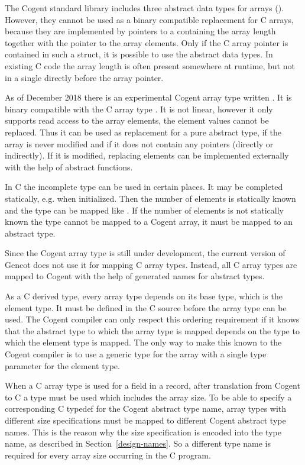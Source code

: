 The Cogent standard library includes three abstract data types for arrays (). 
However, they cannot be used as a binary compatible replacement for C arrays, because they are implemented by 
pointers to a  containing the array length together with the pointer to the array elements. 
Only if the C array pointer is contained in such a struct, it is possible to use the abstract data types. 
In existing C code the array length is often present somewhere at runtime, but not in a single 
directly before the array pointer.

As of December 2018 there is an experimental Cogent array type written . It is binary compatible 
with the C array type . It is not linear, however it only supports read access to the array elements, 
the element values cannot be replaced. Thus it can be used as replacement for a pure abstract type, if the array 
is never modified and if it does not contain any pointers (directly or indirectly). If it is modified, replacing
elements can be implemented externally with the help of abstract functions.

In C the incomplete type  can be used in certain places. It may be completed statically, e.g. 
when initialized. Then the number of elements is statically known and the type can be mapped like .
If the number of elements is not statically known the type cannot be mapped to a Cogent array, it must be mapped 
to an abstract type.

Since the Cogent array type is still under development, the current version of Gencot does not use it for
mapping C array types. Instead, all C array types are mapped to Cogent with the help of generated names for 
abstract types.

As a C derived type, every array type depends on its base type, which is the element type. It must be defined in
the C source before the array type can be used. The Cogent compiler can only respect this ordering requirement if
it knows that the abstract type to which the array type is mapped depends on the type to which the element type
is mapped. The only way to make this known to the Cogent compiler is to use a generic type for the array with
a single type parameter for the element type. 

When a C array type is used for a field in a record, after translation from Cogent to C a type
must be used which includes the array size. To be able to specify a corresponding C typedef for the 
Cogent abstract type name, array types with different size specifications must be mapped to different 
Cogent abstract type names. This is the reason why the size specification is encoded into the type name,
as described in Section~\ref{design-names}. So a different type name is required for every array size 
occurring in the C program.

